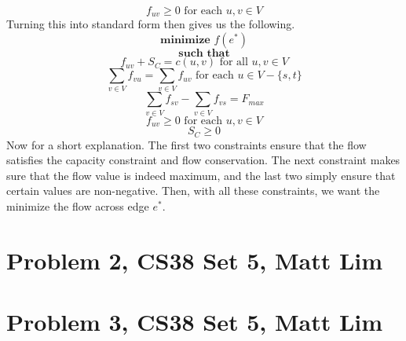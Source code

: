 \documentclass{article}
\begin{document}
\begin{description}
        \[ f_{uv} \ge 0 \text{ for each $u,v \in V$} \]
        Turning this into standard form then gives us the following.
        \[ \textbf{minimize } f(e^*) \]
        \[ \textbf{such that} \]
        \[ f_{uv} + S_C = c(u,v) \text{ for all $u,v \in V$} \]
        \[ \sum_{v \in V} f_{vu} = \sum_{v \in V} f_{uv} \text{ for each $u \in
        V - \{s,t\}$} \]
        \[ \sum_{v \in V} f_{sv} - \sum_{v \in V} f_{vs} = F_{max} \]
        \[ f_{uv} \ge 0 \text{ for each $u,v \in V$} \]
        \[ S_C \ge 0 \]
        Now for a short explanation. The first two constraints ensure that the
        flow satisfies the capacity constraint and flow conservation. The next
        constraint makes sure that the flow value is indeed maximum, and the last
        two simply ensure that certain values are non-negative. Then, with all
        these constraints, we want the minimize the flow across edge $e^*$.
\end{description}
\newpage

\section*{Problem 2, CS38 Set 5, Matt Lim}
\newpage

\section*{Problem 3, CS38 Set 5, Matt Lim}
\newpage

\end{document}
